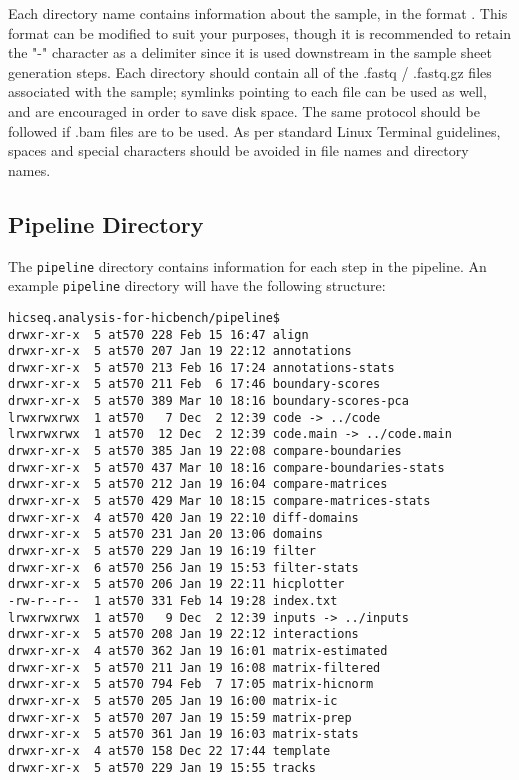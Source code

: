 Each directory name contains information about the sample, in the format . This format can be modified to suit your purposes, though it is recommended to retain the "-" character as a delimiter since it is used downstream in the sample sheet generation steps. Each directory should contain all of the .fastq / .fastq.gz files associated with the sample; symlinks pointing to each file can be used as well, and are encouraged in order to save disk space. The same protocol should be followed if .bam files are to be used. As per standard Linux Terminal guidelines, spaces and special characters should be avoided in file names and directory names. 

\subsection{Pipeline Directory}
The \texttt{pipeline} directory contains information for each step in the pipeline. An example \texttt{pipeline} directory will have the following structure: 

\begin{lstlisting}
hicseq.analysis-for-hicbench/pipeline$
drwxr-xr-x  5 at570 228 Feb 15 16:47 align
drwxr-xr-x  5 at570 207 Jan 19 22:12 annotations
drwxr-xr-x  5 at570 213 Feb 16 17:24 annotations-stats
drwxr-xr-x  5 at570 211 Feb  6 17:46 boundary-scores
drwxr-xr-x  5 at570 389 Mar 10 18:16 boundary-scores-pca
lrwxrwxrwx  1 at570   7 Dec  2 12:39 code -> ../code
lrwxrwxrwx  1 at570  12 Dec  2 12:39 code.main -> ../code.main
drwxr-xr-x  5 at570 385 Jan 19 22:08 compare-boundaries
drwxr-xr-x  5 at570 437 Mar 10 18:16 compare-boundaries-stats
drwxr-xr-x  5 at570 212 Jan 19 16:04 compare-matrices
drwxr-xr-x  5 at570 429 Mar 10 18:15 compare-matrices-stats
drwxr-xr-x  4 at570 420 Jan 19 22:10 diff-domains
drwxr-xr-x  5 at570 231 Jan 20 13:06 domains
drwxr-xr-x  5 at570 229 Jan 19 16:19 filter
drwxr-xr-x  6 at570 256 Jan 19 15:53 filter-stats
drwxr-xr-x  5 at570 206 Jan 19 22:11 hicplotter
-rw-r--r--  1 at570 331 Feb 14 19:28 index.txt
lrwxrwxrwx  1 at570   9 Dec  2 12:39 inputs -> ../inputs
drwxr-xr-x  5 at570 208 Jan 19 22:12 interactions
drwxr-xr-x  4 at570 362 Jan 19 16:01 matrix-estimated
drwxr-xr-x  5 at570 211 Jan 19 16:08 matrix-filtered
drwxr-xr-x  5 at570 794 Feb  7 17:05 matrix-hicnorm
drwxr-xr-x  5 at570 205 Jan 19 16:00 matrix-ic
drwxr-xr-x  5 at570 207 Jan 19 15:59 matrix-prep
drwxr-xr-x  5 at570 361 Jan 19 16:03 matrix-stats
drwxr-xr-x  4 at570 158 Dec 22 17:44 template
drwxr-xr-x  5 at570 229 Jan 19 15:55 tracks
\end{lstlisting}

